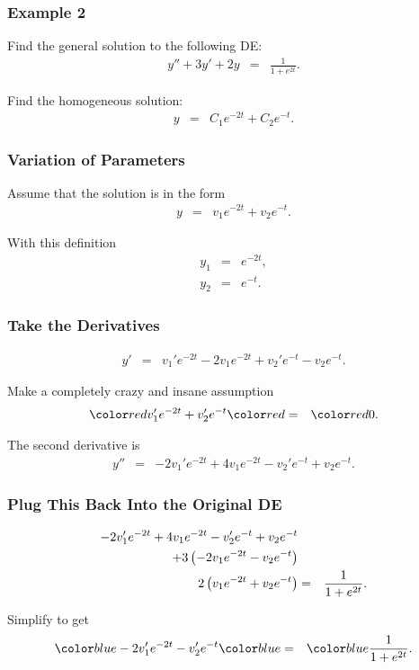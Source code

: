 \begin{frame}
  \frametitle{Example 2}
  Find the general solution to the following DE: 
  \begin{eqnarray*}
          y'' + 3y' + 2y & = & \frac{1}{1+e^{2t}}.
  \end{eqnarray*}
 
  {
    Find the homogeneous solution:
    \begin{eqnarray*}
      y & = & C_1 e^{-2t} + C_2 e^{-t}.
    \end{eqnarray*}
  }

\end{frame}


\begin{frame}
  \frametitle{Variation of Parameters}

  Assume that the solution is in the form
  \begin{eqnarray*}
    y & = & v_1 e^{-2t} + v_2 e^{-t}.
  \end{eqnarray*}

  With this definition
  \begin{eqnarray*}
    y_1 & = & e^{-2t}, \\
    y_2 & = & e^{-t}.
  \end{eqnarray*}

\end{frame}

\begin{frame}
  \frametitle{Take the Derivatives}
  \begin{eqnarray*}
    y' & = & v_1'e^{-2t} -2 v_1 e^{-2t} + v_2' e^{-t} - v_2 e^{-t}.
  \end{eqnarray*}

  Make a completely crazy and insane assumption
  \begin{eqnarray*}
    \redText{v_1'e^{-2t} + v_2' e^{-t}} & \redText{=} & \redText{0}.
  \end{eqnarray*}

  The second derivative is
  \begin{eqnarray*}
    y'' & = & -2 v_1' e^{-2t} + 4 v_1 e^{-2t} - v_2' e^{-t} + v_2 e^{-t}.
  \end{eqnarray*}
\end{frame}

\begin{frame}
  \frametitle{Plug This Back Into the Original DE}

  \begin{eqnarray*}
    -2 v_1' e^{-2t} + 4 v_1 e^{-2t} - v_2' e^{-t} + v_2 e^{-t} & & \\
    + 3 \left( -2 v_1 e^{-2t} - v_2 e^{-t} \right) & & \\
    2 \left( v_1 e^{-2t} + v_2 e^{-t} \right) & = & \frac{1}{1+e^{2t}}.
  \end{eqnarray*}

  Simplify to get
  \begin{eqnarray*}
    \blueText{-2 v_1' e^{-2t}  - v_2' e^{-t}} & \blueText{=} & \blueText{\frac{1}{1+e^{2t}}}.
  \end{eqnarray*}

\end{frame}

